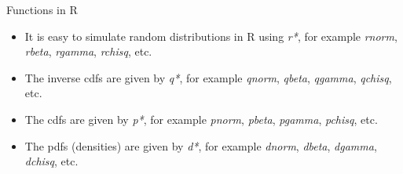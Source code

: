\documentclass
[handout]
{beamer}
\begin{document}
\begin{frame}{Functions in R}
\begin{itemize}
\item It is easy to simulate random distributions in R using {\em r*}, for example {\em rnorm}, {\em rbeta}, {\em rgamma}, {\em rchisq}, etc.
\pause
\item The inverse cdfs are given by {\em q*}, for example {\em qnorm}, {\em qbeta}, {\em qgamma}, {\em qchisq}, etc.
\pause
\item The cdfs are given by {\em p*}, for example {\em pnorm}, {\em pbeta}, {\em pgamma}, {\em pchisq}, etc.
\pause
\item The pdfs (densities) are given by {\em d*}, for example {\em dnorm}, {\em dbeta}, {\em dgamma}, {\em dchisq}, etc.
\end{itemize}
\end{frame}
\end{document}
